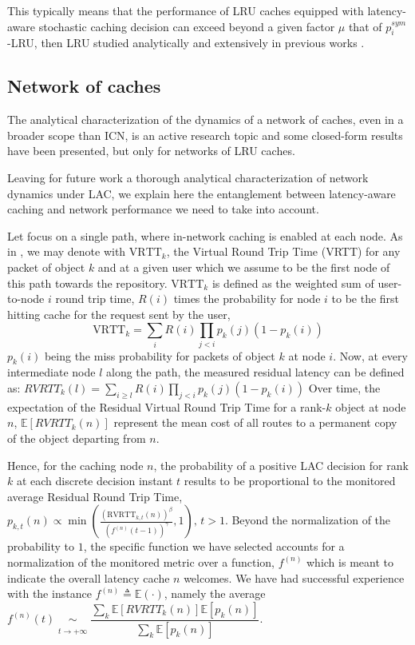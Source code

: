 \documentclass[conference]{IEEEtran}
\newcommand{\E}{\mathbb{E}}
\newcommand{\VR}{\mbox{VRTT}}
\begin{document}
This typically means that the performance of LRU caches equipped with latency-aware stochastic caching decision can exceed beyond a given factor $\mu$ that of $p_i^{sym}$-LRU, then LRU studied analytically and extensively in previous works \cite{Carofiglio:2013:PBS:2542828.2542992}.


\subsection{Network of caches}
\label{subsec:network_of_caches}

The analytical characterization of the dynamics of a network of caches, even in a broader scope than ICN, is an active research topic \cite{DBLP:journals/icl/Blefari-MelazziBCD14} \cite{Rosensweig:2010:AMG:1833515.1833684}\cite{journals/corr/JinYKSYHL13} and some closed-form results have been presented, but only for networks of LRU caches\cite{Carofiglio:2013:PBS:2542828.2542992}. 


Leaving for future work a thorough analytical characterization of network dynamics under LAC, we explain here the entanglement between latency-aware caching and network performance we need to take into account.

Let focus on a single path, where in-network caching is enabled at each node.
As in \cite{ITC,Carofiglio:2013:PBS:2542828.2542992}, we may denote with $\VR_k$, the Virtual Round Trip Time (VRTT) for any packet of object $k$ and at a given user which we assume to be the first node of this path towards the repository. $\VR_k$ is defined as the weighted sum of user-to-node $i$ round trip time, $R(i)$ times the probability for node $i$ to be the first hitting cache for the request sent by the user, 
$$
\VR_k=\sum_i R(i) \prod_{j<i}p_k(j)(1-p_k(i))
$$
$p_k(i)$ being the miss probability for packets of object $k$ at node $i$.
Now, at every intermediate node $l$ along the path, the measured residual latency can be defined as:
$RVRTT_k(l) = \sum_{i\ge l} R(i) \prod_{j<i}p_k(j)(1-p_k(i))$
Over time, the expectation of the Residual Virtual Round Trip Time for a rank-$k$ 
object at node $n$, $\mathbb{E}[RVRTT_k(n)]$ represent the mean cost of all routes 
to a permanent copy of the object departing from $n$. 

Hence, for the caching node $n$, the probability of a positive LAC decision for rank $k$ at each discrete decision instant $t$ results to be proportional to the monitored average Residual Round Trip Time, \\
$p_{k,t}(n) \propto \min (\frac{(\mbox{RVRTT}_{k,t}(n) )^{\beta}}{\left(f^{(n)}(t-1)\right)^{\gamma}} , 1) \text{, }t > 1$.
Beyond the normalization of the probability to $1$, the specific function we have selected accounts for a normalization of the monitored metric over a function,  $f^{(n)}$ which is meant to indicate the overall latency cache $n$ welcomes. 
We have had successful experience with the instance $f^{(n)} \triangleq \E\left(\cdot \right)$, namely the average
$f^{(n)}(t) \underset{\substack{
\\ t \to +\infty}}{\sim} \dfrac{\sum \limits_k  \mathbb{E}[RVRTT_k(n)] \mathbb{E}[p_k(n)]}{ \sum \limits_k \mathbb{E}[p_k(n)]}$.
\end{document}
